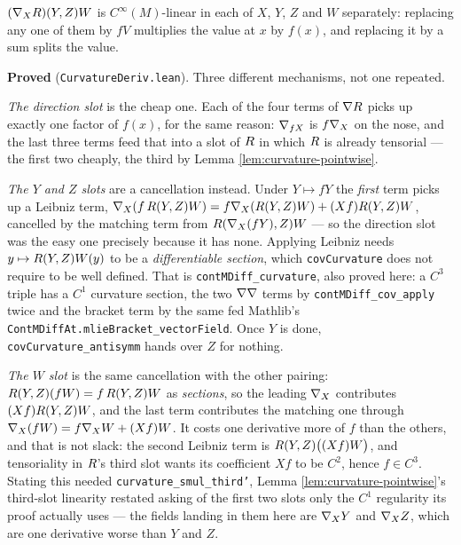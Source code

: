 \begin{lemma}
  \label{lem:cov-curvature-direction}
  \leanok
  $(\nabla_X R)(Y,Z)W$ is $C^\infty(M)$-linear in each of $X$, $Y$, $Z$ and
  $W$ separately: replacing any one of them by $fV$ multiplies the value at $x$
  by $f(x)$, and replacing it by a sum splits the value.

  \textbf{Proved} (\texttt{CurvatureDeriv.lean}). Three different mechanisms,
  not one repeated.

  \emph{The direction slot} is the cheap one. Each of the four terms of
  $\nabla R$ picks up exactly one factor of $f(x)$, for the same reason:
  $\nabla_{fX}$ is $f\nabla_X$ on the nose, and the last three terms feed that into
  a slot of $R$ in which $R$ is already tensorial --- the first two
  cheaply, the third by Lemma \ref{lem:curvature-pointwise}.

  \emph{The $Y$ and $Z$ slots} are a cancellation instead. Under $Y \mapsto fY$
  the \emph{first} term picks up a Leibniz term,
  $\nabla_X(f\,R(Y,Z)W) = f\nabla_X(R(Y,Z)W) + (Xf)R(Y,Z)W$, cancelled
  by the matching term from $R(\nabla_X(fY),Z)W$ --- so the direction slot was
  the easy one precisely because it has none. Applying Leibniz needs $y \mapsto
  R(Y,Z)W(y)$ to be a \emph{differentiable section}, which
  \texttt{covCurvature} does not require to be well defined. That is
  \texttt{contMDiff\_curvature}, also proved here: a $C^3$ triple has a $C^1$
  curvature section, the two $\nabla\nabla$ terms by
  \texttt{contMDiff\_cov\_apply} twice and the bracket term by the same fed
  Mathlib's \texttt{ContMDiffAt.mlieBracket\_vectorField}. Once $Y$ is done,
  \texttt{covCurvature\_antisymm} hands over $Z$ for nothing.

  \emph{The $W$ slot} is the same cancellation with the other pairing:
  $R(Y,Z)(fW) = f\,R(Y,Z)W$ as \emph{sections}, so the leading $\nabla_X$
  contributes $(Xf)R(Y,Z)W$, and the last term contributes the matching one
  through $\nabla_X(fW) = f\nabla_X W + (Xf)W$. It costs one derivative more of $f$
  than the others, and that is not slack: the second Leibniz term is
  $R(Y,Z)\big((Xf)W\big)$, and tensoriality in $R$'s third slot wants
  its coefficient $Xf$ to be $C^2$, hence $f \in C^3$. Stating this needed
  \texttt{curvature\_smul\_third'}, Lemma \ref{lem:curvature-pointwise}'s
  third-slot linearity restated asking of the first two slots only the $C^1$
  regularity its proof actually uses --- the fields landing in them here are
  $\nabla_X Y$ and $\nabla_X Z$, which are one derivative worse than $Y$ and $Z$.


\end{lemma}
